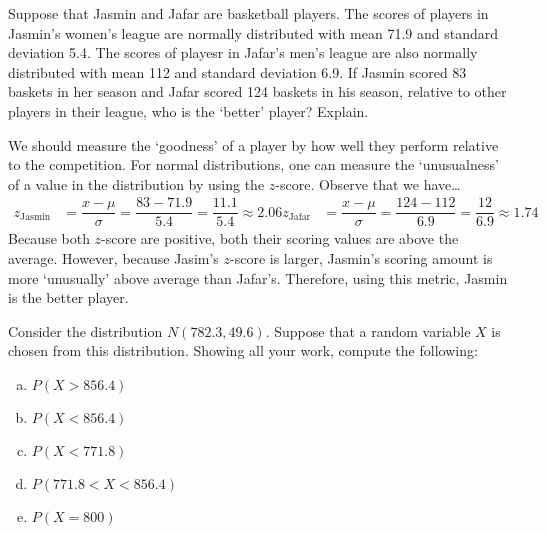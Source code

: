 \documentclass[11pt,letterpaper]{article}
\begin{document}

 Suppose that Jasmin and Jafar are basketball players. The scores of players in Jasmin's women's league are normally distributed with mean 71.9 and standard deviation 5.4. The scores of playesr in Jafar's men's league are also normally distributed with mean 112 and standard deviation 6.9. If Jasmin scored 83 baskets in her season and Jafar scored 124 baskets in his season, relative to other players in their league, who is the `better' player? Explain. \pspace

\sol We should measure the `goodness' of a player by how well they perform relative to the competition. For normal distributions, one can measure the `unusualness' of a value in the distribution by using the $z$-score. Observe that we have\dots
	\[
	\begin{aligned}
	z_{\text{Jasmin}}&= \dfrac{x - \mu}{\sigma}= \dfrac{83 - 71.9}{5.4}= \dfrac{11.1}{5.4} \approx 2.06
	z_{\text{Jafar}}&= \dfrac{x - \mu}{\sigma}= \dfrac{124 - 112}{6.9}= \dfrac{12}{6.9} \approx 1.74
	\end{aligned}
	\]
Because both $z$-score are positive, both their scoring values are above the average. However, because Jasim's $z$-score is larger, Jasmin's scoring amount is more `unusually' above average than Jafar's. Therefore, using this metric, Jasmin is the better player. 



\newpage



 Consider the distribution $N(782.3,49.6)$. Suppose that a random variable $X$ is chosen from this distribution. Showing all your work, compute the following:
	\begin{enumerate}[(a)]
	\item $P(X > 856.4)$
	\item $P(X < 856.4)$
	\item $P(X < 771.8)$
	\item $P(771.8 < X < 856.4)$
	\item $P(X= 800)$
	\end{enumerate} \pspace
\end{document}
